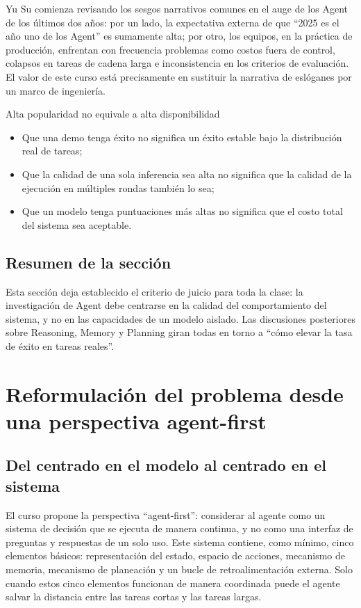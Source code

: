 \documentclass[a4paper]{article}
\begin{document}
Yu Su comienza revisando los sesgos narrativos comunes en el auge de los Agent de los últimos dos años: por un lado, la expectativa externa de que ``2025 es el año uno de los Agent'' es sumamente alta; por otro, los equipos, en la práctica de producción, enfrentan con frecuencia problemas como costos fuera de control, colapsos en tareas de cadena larga e inconsistencia en los criterios de evaluación. El valor de este curso está precisamente en sustituir la narrativa de eslóganes por un marco de ingeniería.

\begin{warningbox}{Alta popularidad no equivale a alta disponibilidad}
\begin{itemize}
    \item Que una demo tenga éxito no significa un éxito estable bajo la distribución real de tareas;
    \item Que la calidad de una sola inferencia sea alta no significa que la calidad de la ejecución en múltiples rondas también lo sea;
    \item Que un modelo tenga puntuaciones más altas no significa que el costo total del sistema sea aceptable.
\end{itemize}
\end{warningbox}

\subsection{Resumen de la sección}
Esta sección deja establecido el criterio de juicio para toda la clase: la investigación de Agent debe centrarse en la calidad del comportamiento del sistema, y no en las capacidades de un modelo aislado. Las discusiones posteriores sobre Reasoning, Memory y Planning giran todas en torno a ``cómo elevar la tasa de éxito en tareas reales''.
\section{Reformulación del problema desde una perspectiva agent-first}

\subsection{Del centrado en el modelo al centrado en el sistema}

El curso propone la perspectiva ``agent-first'': considerar al agente como un sistema de decisión que se ejecuta de manera continua, y no como una interfaz de preguntas y respuestas de un solo uso. Este sistema contiene, como mínimo, cinco elementos básicos: representación del estado, espacio de acciones, mecanismo de memoria, mecanismo de planeación y un bucle de retroalimentación externa. Solo cuando estos cinco elementos funcionan de manera coordinada puede el agente salvar la distancia entre las tareas cortas y las tareas largas.
\end{document}
